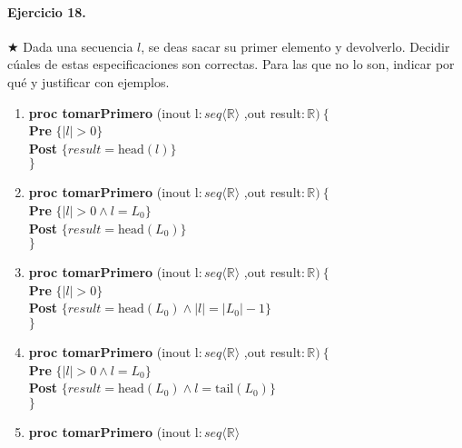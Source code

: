 \documentclass[a4paper]{article}
\begin{document}
\paragraph*{Ejercicio 18.}$\bigstar$ Dada una secuencia $l$, se deas sacar su primer elemento y devolverlo. Decidir cúales de estas especificaciones son correctas. Para las que no lo son, indicar por qué y justificar con ejemplos.
	\begin{enumerate}[label=\alph*)]
		\item
			\textbf{proc tomarPrimero }(inout l$: seq\langle \mathbb{R}\rangle $
			,out result$:\mathbb{R})\ \{$\smallskip \\
			\hspace*{6mm} \textbf{Pre }$\{ |l|> 0\}$\smallskip \\
			\hspace*{6mm} \textbf{Post }$\{result=\textrm{head}(l)\}$\\
			$\}$
		\item
			\textbf{proc tomarPrimero }(inout l$: seq\langle \mathbb{R}\rangle $
			,out result$:\mathbb{R})\ \{$\smallskip \\
			\hspace*{6mm} \textbf{Pre }$\{ |l|> 0\wedge l=L_0\}$\smallskip \\
			\hspace*{6mm} \textbf{Post }$\{result=\textrm{head}(L_0)\}$\\
			$\}$
		\item
			\textbf{proc tomarPrimero }(inout l$: seq\langle \mathbb{R}\rangle $
			,out result$:\mathbb{R})\ \{$\smallskip \\
			\hspace*{6mm} \textbf{Pre }$\{ |l|> 0\}$\smallskip \\
			\hspace*{6mm} \textbf{Post }$\{result=\textrm{head}(L_0)\wedge
					|l|=|L_0|-1\}$\\
			$\}$
		\item
			\textbf{proc tomarPrimero }(inout l$: seq\langle \mathbb{R}\rangle $
			,out result$:\mathbb{R})\ \{$\smallskip \\
			\hspace*{6mm} \textbf{Pre }$\{ |l|> 0\wedge l=L_0\}$\smallskip \\
			\hspace*{6mm} \textbf{Post }$\{result=\textrm{head}(L_0)\wedge
					l=\textrm{tail}(L_0)\}$\\
			$\}$
		\item 
			\textbf{proc tomarPrimero }(inout l$: seq\langle \mathbb{R}\rangle $

\end{enumerate}
\end{document}
